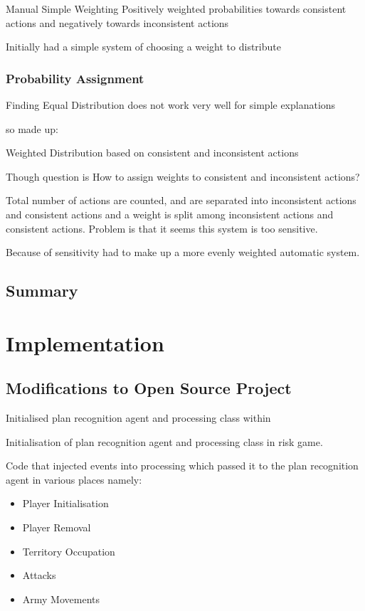 \documentclass[parskip]{cs4rep}
\begin{document}
Manual Simple Weighting
Positively weighted probabilities towards consistent actions and negatively towards inconsistent actions

Initially had a simple system of choosing a weight to distribute

\subsubsection{Probability Assignment}

Finding
Equal Distribution does not work very well for simple explanations

so made up:

Weighted Distribution based on consistent and inconsistent actions

Though question is How to assign weights to consistent and inconsistent actions?

Total number of actions are counted, and are separated into inconsistent actions and consistent actions and a weight is split among inconsistent actions and consistent actions. Problem is that it seems this system is too sensitive.

Because of sensitivity had to make up a more evenly weighted automatic system.

\subsection{Summary}

\section{Implementation}

\subsection{Modifications to Open Source Project}

Initialised plan recognition agent and processing class within 

Initialisation of plan recognition agent and processing class in risk game.

Code that injected events into processing which passed it to the plan recognition agent in various places namely:

\begin{itemize}
\item
Player Initialisation
\item
Player Removal
\item
Territory Occupation
\item
Attacks
\item
Army Movements
\end{itemize}
\end{document}
